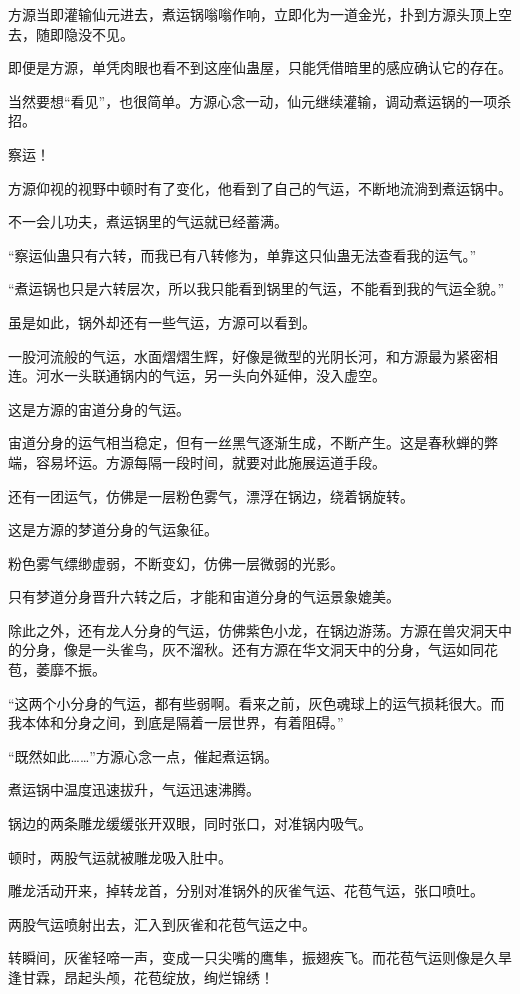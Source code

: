 \begin{this_body}
方源当即灌输仙元进去，煮运锅嗡嗡作响，立即化为一道金光，扑到方源头顶上空去，随即隐没不见。

即便是方源，单凭肉眼也看不到这座仙蛊屋，只能凭借暗里的感应确认它的存在。

当然要想“看见”，也很简单。方源心念一动，仙元继续灌输，调动煮运锅的一项杀招。

察运！

方源仰视的视野中顿时有了变化，他看到了自己的气运，不断地流淌到煮运锅中。

不一会儿功夫，煮运锅里的气运就已经蓄满。

“察运仙蛊只有六转，而我已有八转修为，单靠这只仙蛊无法查看我的运气。”

“煮运锅也只是六转层次，所以我只能看到锅里的气运，不能看到我的气运全貌。”

虽是如此，锅外却还有一些气运，方源可以看到。

一股河流般的气运，水面熠熠生辉，好像是微型的光阴长河，和方源最为紧密相连。河水一头联通锅内的气运，另一头向外延伸，没入虚空。

这是方源的宙道分身的气运。

宙道分身的运气相当稳定，但有一丝黑气逐渐生成，不断产生。这是春秋蝉的弊端，容易坏运。方源每隔一段时间，就要对此施展运道手段。

还有一团运气，仿佛是一层粉色雾气，漂浮在锅边，绕着锅旋转。

这是方源的梦道分身的气运象征。

粉色雾气缥缈虚弱，不断变幻，仿佛一层微弱的光影。

只有梦道分身晋升六转之后，才能和宙道分身的气运景象媲美。

除此之外，还有龙人分身的气运，仿佛紫色小龙，在锅边游荡。方源在兽灾洞天中的分身，像是一头雀鸟，灰不溜秋。还有方源在华文洞天中的分身，气运如同花苞，萎靡不振。

“这两个小分身的气运，都有些弱啊。看来之前，灰色魂球上的运气损耗很大。而我本体和分身之间，到底是隔着一层世界，有着阻碍。”

“既然如此……”方源心念一点，催起煮运锅。

煮运锅中温度迅速拔升，气运迅速沸腾。

锅边的两条雕龙缓缓张开双眼，同时张口，对准锅内吸气。

顿时，两股气运就被雕龙吸入肚中。

雕龙活动开来，掉转龙首，分别对准锅外的灰雀气运、花苞气运，张口喷吐。

两股气运喷射出去，汇入到灰雀和花苞气运之中。

转瞬间，灰雀轻啼一声，变成一只尖嘴的鹰隼，振翅疾飞。而花苞气运则像是久旱逢甘霖，昂起头颅，花苞绽放，绚烂锦绣！

\end{this_body}

